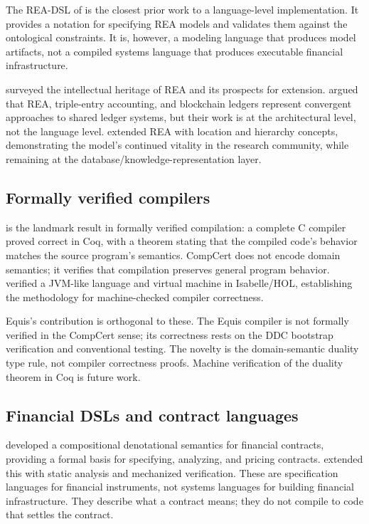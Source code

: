 \documentclass[11pt,a4paper]{article}
\theoremstyle{remark}
\begin{document}
The REA-DSL of \citet{sonnenberg_rea-dsl_2011} is the closest prior work
to a language-level implementation. It provides a notation for
specifying REA models and validates them against the ontological
constraints. It is, however, a modeling language that produces model
artifacts, not a compiled systems language that produces executable
financial infrastructure.

\citet{dunn_rea_1997} surveyed the intellectual heritage of REA and its
prospects for extension. \citet{ibanez_rea_2020} argued that REA,
triple-entry accounting, and blockchain ledgers represent convergent
approaches to shared ledger systems, but their work is at the
architectural level, not the language level. \citet{oleary_mitigating_2025}
extended REA with location and hierarchy concepts, demonstrating the
model's continued vitality in the research community, while remaining
at the database/knowledge-representation layer.

\subsection{Formally verified compilers}

\citet{leroy_formal_2009} is the landmark result in formally verified
compilation: a complete C compiler proved correct in Coq, with a
theorem stating that the compiled code's behavior matches the source
program's semantics. CompCert does not encode domain semantics; it
verifies that compilation preserves general program behavior.
\citet{klein_machine-checked_2006} verified a JVM-like language and virtual
machine in Isabelle/HOL, establishing the methodology for
machine-checked compiler correctness.

Equis's contribution is orthogonal to these. The Equis compiler is not
formally verified in the CompCert sense; its correctness rests on the
DDC bootstrap verification and conventional testing. The novelty is the
domain-semantic duality type rule, not compiler correctness proofs.
Machine verification of the duality theorem in Coq is future work.

\subsection{Financial DSLs and contract languages}

\citet{andersen_compositional_2006} developed a compositional denotational
semantics for financial contracts, providing a formal basis for
specifying, analyzing, and pricing contracts.
\citet{henglein_formally_2020} extended this with static analysis and
mechanized verification. These are specification languages for
financial instruments, not systems languages for building financial
infrastructure. They describe what a contract means; they do not
compile to code that settles the contract.
\end{document}
